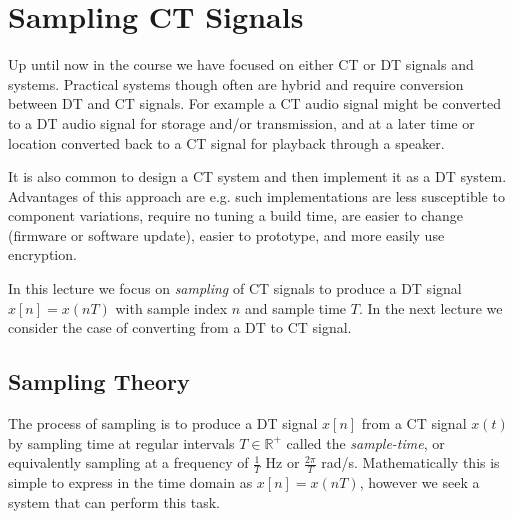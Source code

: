 \chapter{Sampling CT Signals}

Up until now in the course we have focused on either CT or DT signals and systems. Practical systems though often are hybrid and require conversion between DT and CT signals. For example a CT audio signal might be converted to a DT audio signal for storage and/or transmission, and at a later time or location converted back to a CT signal for playback through a speaker.

It is also common to design a CT system and then implement it as a DT system. Advantages of this approach are e.g. such implementations are less susceptible to component variations, require no tuning a build time, are easier to change (firmware or software update), easier to prototype, and more easily use encryption. 

In this lecture we focus on \emph{sampling} of CT signals to produce a DT signal $x[n] = x(nT)$ with sample index $n$ and sample time $T$. In the next lecture we consider the case of converting from a DT to CT signal. 

\section{Sampling Theory}

The process of sampling is to produce a DT signal $x[n]$ from a CT signal $x(t)$ by sampling time at regular intervals $T\in \mathbb{R}^+$ called the \emph{sample-time}, or equivalently sampling at a frequency of $\tfrac{1}{T}$ Hz or $\tfrac{2\pi}{T}$ rad/s. Mathematically this is simple to express in the time domain as $x[n] = x(nT)$, however we seek a system that can perform this task.

